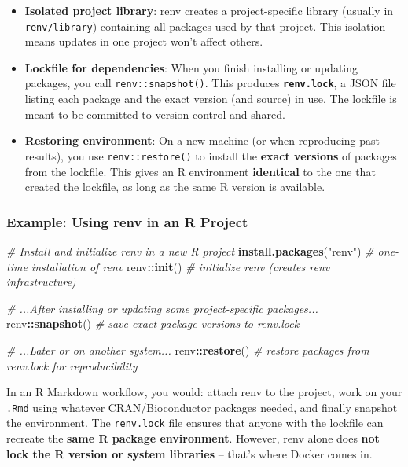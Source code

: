 \documentclass[
  11pt,
]{article}
\newenvironment{Shaded}{\begin{snugshade}}{\end{snugshade}}
\newcommand{\CommentTok}[1]{\textcolor[rgb]{0.56,0.35,0.01}{\textit{#1}}}
\newcommand{\FunctionTok}[1]{\textcolor[rgb]{0.13,0.29,0.53}{\textbf{#1}}}
\newcommand{\NormalTok}[1]{#1}
\newcommand{\SpecialCharTok}[1]{\textcolor[rgb]{0.81,0.36,0.00}{\textbf{#1}}}
\newcommand{\StringTok}[1]{\textcolor[rgb]{0.31,0.60,0.02}{#1}}
\providecommand{\tightlist}{%
  \setlength{\itemsep}{0pt}\setlength{\parskip}{0pt}}
\begin{document}
\begin{itemize}
\tightlist
\item
  \textbf{Isolated project library}: renv creates a project-specific
  library (usually in \texttt{renv/library}) containing all packages
  used by that project. This isolation means updates in one project
  won't affect others.
\item
  \textbf{Lockfile for dependencies}: When you finish installing or
  updating packages, you call \texttt{renv::snapshot()}. This produces
  \textbf{\texttt{renv.lock}}, a JSON file listing each package and the
  exact version (and source) in use. The lockfile is meant to be
  committed to version control and shared.
\item
  \textbf{Restoring environment}: On a new machine (or when reproducing
  past results), you use \texttt{renv::restore()} to install the
  \textbf{exact versions} of packages from the lockfile. This gives an R
  environment \textbf{identical} to the one that created the lockfile,
  as long as the same R version is available.
\end{itemize}

\subsubsection{Example: Using renv in an R
Project}\label{example-using-renv-in-an-r-project}

\begin{Shaded}
\begin{Highlighting}[]
\CommentTok{\# Install and initialize renv in a new R project}
\FunctionTok{install.packages}\NormalTok{(}\StringTok{"renv"}\NormalTok{)      }\CommentTok{\# one{-}time installation of renv}
\NormalTok{renv}\SpecialCharTok{::}\FunctionTok{init}\NormalTok{()                  }\CommentTok{\# initialize renv (creates renv infrastructure)}

\CommentTok{\# ...After installing or updating some project{-}specific packages...}
\NormalTok{renv}\SpecialCharTok{::}\FunctionTok{snapshot}\NormalTok{()              }\CommentTok{\# save exact package versions to renv.lock}

\CommentTok{\# ...Later or on another system...}
\NormalTok{renv}\SpecialCharTok{::}\FunctionTok{restore}\NormalTok{()               }\CommentTok{\# restore packages from renv.lock for reproducibility}
\end{Highlighting}
\end{Shaded}

In an R Markdown workflow, you would: attach renv to the project, work
on your \texttt{.Rmd} using whatever CRAN/Bioconductor packages needed,
and finally snapshot the environment. The \texttt{renv.lock} file
ensures that anyone with the lockfile can recreate the \textbf{same R
package environment}. However, renv alone does \textbf{not lock the R
version or system libraries} -- that's where Docker comes in.
\end{document}
